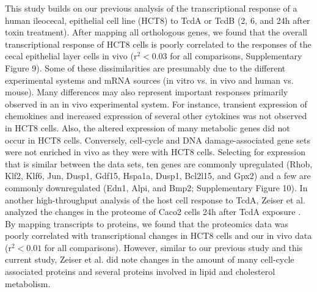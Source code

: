 This study builds on our previous analysis of the transcriptional response of a human ileocecal, epithelial cell line (HCT8) to TcdA or TcdB (2, 6, and 24h after toxin treatment). After mapping all orthologous genes, we found that the overall transcriptional response of HCT8 cells is poorly correlated to the responses of the cecal epithelial layer cells in vivo ($\text{r}^{2}<0.03$ for all comparisons, Supplementary Figure 9). Some of these dissimilarities are presumably due to the different experimental systems and mRNA sources (in vitro vs. in vivo and human vs. mouse). Many differences may also represent important responses primarily observed in an in vivo experimental system. For instance, transient expression of chemokines and increased expression of several other cytokines was not observed in HCT8 cells. Also, the altered expression of many metabolic genes did not occur in HCT8 cells. Conversely, cell-cycle and DNA damage-associated gene sets were not enriched in vivo as they were with HCT8 cells. Selecting for expression that is similar between the data sets, ten genes are commonly upregulated (Rhob, Klf2, Klf6, Jun, Dusp1, Gdf15, Hspa1a, Dusp1, Bcl2l15, and Gpx2) and a few are commonly downregulated (Edn1, Alpi, and Bmp2; Supplementary Figure 10). In another high-throughput analysis of the host cell response to TcdA, Zeiser et al. analyzed the changes in the proteome of Caco2 cells 24h after TcdA exposure \cite{Zeiser:2013cu}. By mapping transcripts to proteins, we found that the proteomics data was poorly correlated with transcriptional changes in HCT8 cells and our in vivo data ($\text{r}^{2}<0.01$ for all comparisons). However, similar to our previous study and this current study, Zeiser et al. did note changes in the amount of many cell-cycle associated proteins and several proteins involved in lipid and cholesterol metabolism.

